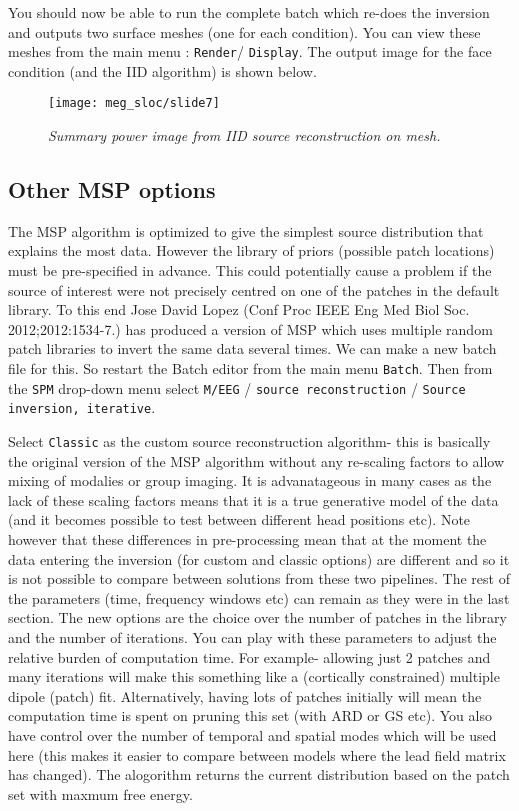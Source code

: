 You should now be able to run the complete batch which re-does the inversion and outputs two surface meshes (one for each condition). You can view these meshes from the main menu : \texttt{Render}/ \texttt{Display}. The output image for the face condition (and the IID algorithm) is shown below. 


\begin{figure}
\begin{center}
\texttt{[image: meg\_sloc/slide7]}
\caption{\em Summary power image from IID source reconstruction on mesh.\label{meg_sloc:fig:7}}
\end{center}
\end{figure}


\subsection{Other MSP options}

The MSP algorithm is optimized to give the simplest source distribution that explains the most data. However the library of priors (possible patch locations) must be pre-specified in advance. This could potentially cause a problem if the source of interest were not precisely centred on one of the patches in the default library. To this end Jose David Lopez (Conf Proc IEEE Eng Med Biol Soc. 2012;2012:1534-7.) has produced a version of MSP which uses multiple random patch libraries to invert the same data several times. 
We can make a new batch file for this. So restart the Batch editor from the main menu \texttt{Batch}. Then from the \texttt{SPM} drop-down menu select \texttt{M/EEG} /  \texttt{source reconstruction} / \texttt{Source inversion, iterative}.

Select \texttt{Classic} as the custom source reconstruction algorithm- this is basically the original version of the MSP algorithm without any re-scaling factors to allow mixing of modalies or group imaging. It is advanatageous in many cases as the lack of these scaling factors means that it is a true generative model of the data (and it becomes possible to test between different head positions etc). Note however that these differences in pre-processing mean that at the moment the data entering the inversion (for custom and classic options) are different and so it is not possible to compare between solutions from these two pipelines.
 The rest of the parameters (time, frequency windows etc) can remain as they were in the last section. The new options are the choice over the number of patches in the library  and the number of iterations. You can play with these parameters to adjust the relative burden of computation time. For example- allowing just 2 patches and many iterations will make this something like a (cortically constrained) multiple dipole (patch) fit. Alternatively, having lots of patches initially will mean the computation time is spent on pruning this set (with ARD or GS etc). 
You also have control over the number of temporal and spatial modes which will be used here (this makes it easier to compare between models where the lead field matrix has changed). 
The alogorithm returns the current distribution based on the patch set with maxmum free energy.

